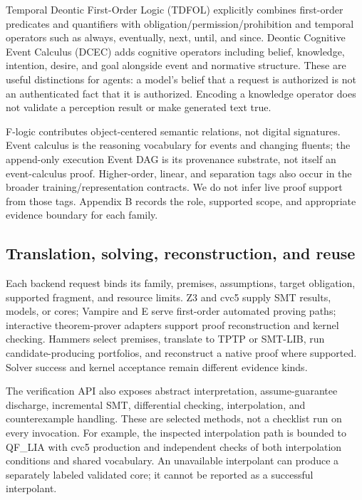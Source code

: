 \documentclass{article}
\begin{document}
Temporal Deontic First-Order Logic (TDFOL) explicitly combines first-order predicates and quantifiers with obligation/permission/prohibition and temporal operators such as always, eventually, next, until, and since. Deontic Cognitive Event Calculus (DCEC) adds cognitive operators including belief, knowledge, intention, desire, and goal alongside event and normative structure. These are useful distinctions for agents: a model's belief that a request is authorized is not an authenticated fact that it is authorized. Encoding a knowledge operator does not validate a perception result or make generated text true.

F-logic contributes object-centered semantic relations, not digital signatures. Event calculus is the reasoning vocabulary for events and changing fluents; the append-only execution Event DAG is its provenance substrate, not itself an event-calculus proof. Higher-order, linear, and separation tags also occur in the broader training/representation contracts. We do not infer live proof support from those tags. Appendix B records the role, supported scope, and appropriate evidence boundary for each family.

\subsection{Translation, solving, reconstruction, and reuse}

Each backend request binds its family, premises, assumptions, target obligation, supported fragment, and resource limits. Z3 and cvc5 supply SMT results, models, or cores; Vampire and E serve first-order automated proving paths; interactive theorem-prover adapters support proof reconstruction and kernel checking. Hammers select premises, translate to TPTP or SMT-LIB, run candidate-producing portfolios, and reconstruct a native proof where supported. Solver success and kernel acceptance remain different evidence kinds.

The verification API also exposes abstract interpretation, assume-guarantee discharge, incremental SMT, differential checking, interpolation, and counterexample handling. These are selected methods, not a checklist run on every invocation. For example, the inspected interpolation path is bounded to QF\_\allowbreak{}LIA with cvc5 production and independent checks of both interpolation conditions and shared vocabulary. An unavailable interpolant can produce a separately labeled validated core; it cannot be reported as a successful interpolant.
\end{document}

